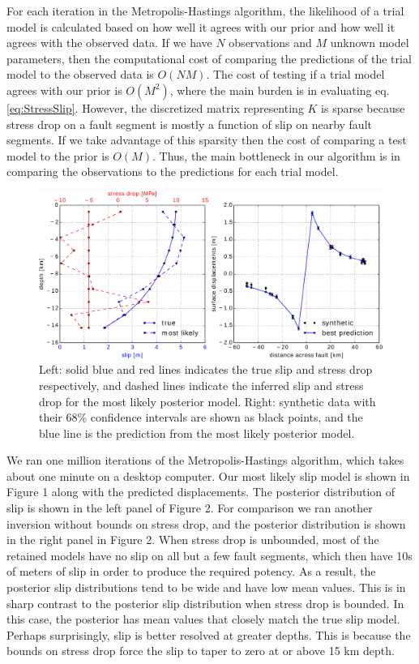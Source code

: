 \documentclass[12pt]{article}
\begin{document}
For each iteration in the Metropolis-Hastings algorithm, the likelihood of a trial model is calculated based on how well it agrees with our prior and how well it agrees with the observed data.  If we have $N$ observations and $M$ unknown model parameters, then the computational cost of comparing the predictions of the trial model to the observed data is $O(NM)$. The cost of testing if a trial model agrees with our prior is $O(M^2)$, where the main burden is in evaluating eq. \ref{eq:StressSlip}.  However, the discretized matrix representing $K$ is sparse because stress drop on a fault segment is mostly a function of slip on nearby fault segments.  If we take advantage of this sparsity then the cost of comparing a test model to the prior is $O(M)$.  Thus, the main bottleneck in our algorithm is in comparing the observations to the predictions for each trial model. 

\begin{figure}
\includegraphics[width=1.0\textwidth]{figure_1}
\caption{Left: solid blue and red lines indicates the true slip and stress drop respectively, and dashed lines indicate the inferred slip and stress drop for the most likely posterior model.  Right: synthetic data with their 68\% confidence intervals are shown as black points, and the blue line is the prediction from the most likely posterior model.}  
\end{figure}

We ran one million iterations of the Metropolis-Hastings algorithm, which takes about one minute on a desktop computer.  Our most likely slip model is shown in Figure 1 along with the predicted displacements.  The posterior distribution of slip is shown in the left panel of Figure 2.  For comparison we ran another inversion without bounds on stress drop, and the posterior distribution is shown in the right panel in Figure 2.  When stress drop is unbounded, most of the retained models have no slip on all but a few fault segments, which then have 10s of meters of slip in order to produce the required potency.  As a result, the posterior slip distributions tend to be wide and have low mean values.  This is in sharp contrast to the posterior slip distribution when stress drop is bounded.  In this case, the posterior has mean values that closely match the true slip model. Perhaps surprisingly, slip is better resolved at greater depths. This is because the bounds on stress drop force the slip to taper to zero at or above 15 km depth.  
\end{document}
